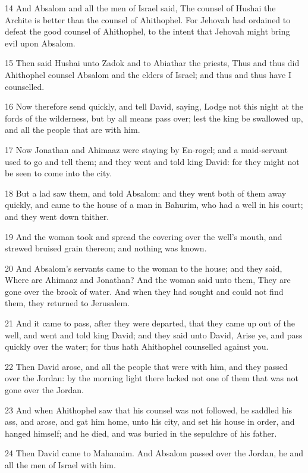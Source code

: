 \par 14 And Absalom and all the men of Israel said, The counsel of Hushai the Archite is better than the counsel of Ahithophel. For Jehovah had ordained to defeat the good counsel of Ahithophel, to the intent that Jehovah might bring evil upon Absalom.
\par 15 Then said Hushai unto Zadok and to Abiathar the priests, Thus and thus did Ahithophel counsel Absalom and the elders of Israel; and thus and thus have I counselled.
\par 16 Now therefore send quickly, and tell David, saying, Lodge not this night at the fords of the wilderness, but by all means pass over; lest the king be swallowed up, and all the people that are with him.
\par 17 Now Jonathan and Ahimaaz were staying by En-rogel; and a maid-servant used to go and tell them; and they went and told king David: for they might not be seen to come into the city.
\par 18 But a lad saw them, and told Absalom: and they went both of them away quickly, and came to the house of a man in Bahurim, who had a well in his court; and they went down thither.
\par 19 And the woman took and spread the covering over the well's mouth, and strewed bruised grain thereon; and nothing was known.
\par 20 And Absalom's servants came to the woman to the house; and they said, Where are Ahimaaz and Jonathan? And the woman said unto them, They are gone over the brook of water. And when they had sought and could not find them, they returned to Jerusalem.
\par 21 And it came to pass, after they were departed, that they came up out of the well, and went and told king David; and they said unto David, Arise ye, and pass quickly over the water; for thus hath Ahithophel counselled against you.
\par 22 Then David arose, and all the people that were with him, and they passed over the Jordan: by the morning light there lacked not one of them that was not gone over the Jordan.
\par 23 And when Ahithophel saw that his counsel was not followed, he saddled his ass, and arose, and gat him home, unto his city, and set his house in order, and hanged himself; and he died, and was buried in the sepulchre of his father.
\par 24 Then David came to Mahanaim. And Absalom passed over the Jordan, he and all the men of Israel with him.
